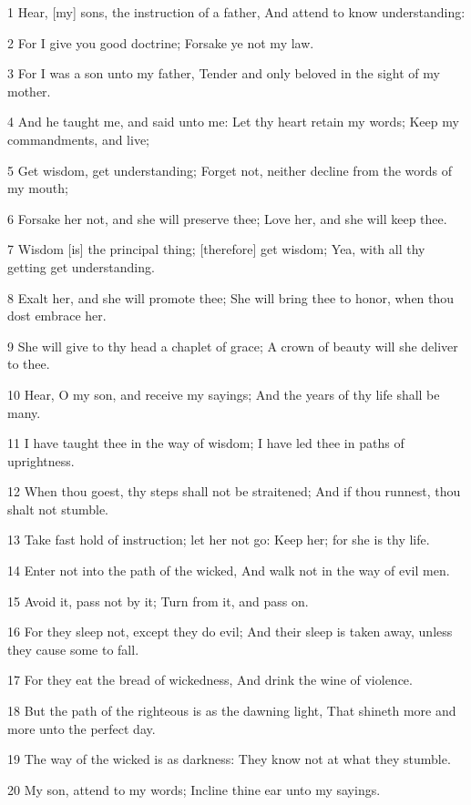 \par 1 Hear, [my] sons, the instruction of a father, And attend to know understanding:
\par 2 For I give you good doctrine; Forsake ye not my law.
\par 3 For I was a son unto my father, Tender and only beloved in the sight of my mother.
\par 4 And he taught me, and said unto me: Let thy heart retain my words; Keep my commandments, and live;
\par 5 Get wisdom, get understanding; Forget not, neither decline from the words of my mouth;
\par 6 Forsake her not, and she will preserve thee; Love her, and she will keep thee.
\par 7 Wisdom [is] the principal thing; [therefore] get wisdom; Yea, with all thy getting get understanding.
\par 8 Exalt her, and she will promote thee; She will bring thee to honor, when thou dost embrace her.
\par 9 She will give to thy head a chaplet of grace; A crown of beauty will she deliver to thee.
\par 10 Hear, O my son, and receive my sayings; And the years of thy life shall be many.
\par 11 I have taught thee in the way of wisdom; I have led thee in paths of uprightness.
\par 12 When thou goest, thy steps shall not be straitened; And if thou runnest, thou shalt not stumble.
\par 13 Take fast hold of instruction; let her not go: Keep her; for she is thy life.
\par 14 Enter not into the path of the wicked, And walk not in the way of evil men.
\par 15 Avoid it, pass not by it; Turn from it, and pass on.
\par 16 For they sleep not, except they do evil; And their sleep is taken away, unless they cause some to fall.
\par 17 For they eat the bread of wickedness, And drink the wine of violence.
\par 18 But the path of the righteous is as the dawning light, That shineth more and more unto the perfect day.
\par 19 The way of the wicked is as darkness: They know not at what they stumble.
\par 20 My son, attend to my words; Incline thine ear unto my sayings.
